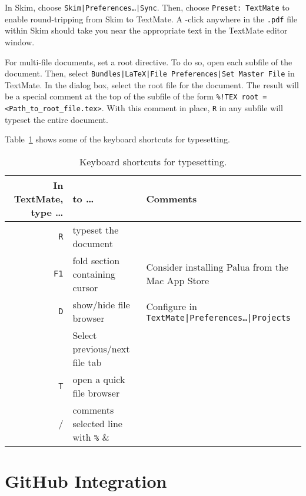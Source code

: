\documentclass[10pt]{article}
\begin{document}
In Skim, choose \texttt{Skim|Preferences\dots|Sync}. 
Then, choose \texttt{Preset:~TextMate} to enable round-tripping from Skim to TextMate. 
A \cmdkey\shiftkey-click anywhere in the \texttt{.pdf} file within Skim 
should take you near the appropriate text in the TextMate editor window.

For multi-file documents, set a root directive. 
To do so, open each subfile of the document. 
Then, select \texttt{Bundles|LaTeX|File Preferences|Set Master File} in TextMate.
In the dialog box, select the root file for the document. 
The result will be a special comment at the top of the subfile of the form
\verb&%!TEX root = <Path_to_root_file.tex>&.
With this comment in place, \cmdkey\texttt{R} in any subfile will typeset the entire document.

Table~\ref{tab:typesetting_keyboard_shortcuts} shows some of the keyboard shortcuts for typesetting.

\begin{table}
\centering
\caption{Keyboard shortcuts for typesetting.}
\begin{tabular}{r|l|l}
	In TextMate, type \dots & to \dots      & Comments                  \\
	\hline
	\cmdkey\texttt{R}           & typeset the document            &                           \\
	\texttt{F1}                 & fold section containing cursor  & Consider installing Palua from the Mac App Store \\
	\ctlkey\optkey\cmdkey\texttt{D}&show/hide file browser        & Configure in \texttt{TextMate|Preferences\dots|Projects} \\
	\cmdkey\shiftkey [, \cmdkey\shiftkey ] & Select previous/next file tab  &          \\
	\cmdkey\texttt{T}           & open a quick file browser                 &          \\
	\cmdkey/                    & comments selected line with \verb!%!      &          \\
\end{tabular}
\label{tab:typesetting_keyboard_shortcuts}
\end{table}



\section{GitHub Integration} %
\label{sec:github_integration}
\end{document}

